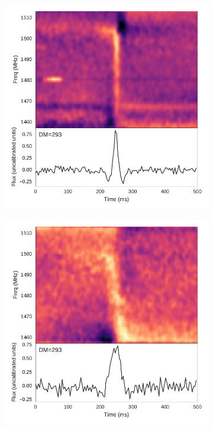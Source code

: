 \documentclass[a4paper,fleqn,usenatbib]{mnras}
\begin{document}
\begin{figure}
    \centering
    \begin{subfigure}[t]{0.45\textwidth}
        \centering\captionsetup{width=.95\linewidth}
        \includegraphics[width=1.0\textwidth]{figures/D20161204_buf23_Beam0.pdf}
        \caption{}
        \label{fig:beam0_dynamic_spec}
    \end{subfigure}
    \begin{subfigure}[t]{0.45\textwidth}
        \centering\captionsetup{width=.95\linewidth}
        \includegraphics[width=1.0\textwidth]{figures/D20161204_buf4_Beam5.pdf}

\end{subfigure}
\end{figure}
\end{document}
